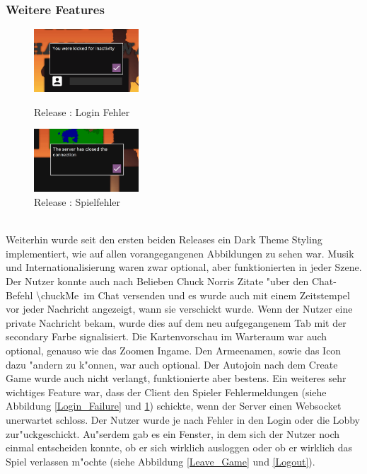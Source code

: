\documentclass[12pt, titlepage]{scrartcl}
\newcommand{\RN}[1]{%
	\textup{\uppercase\expandafter{\romannumeral#1}}%
}
\begin{document}
		    \subsubsection{Weitere Features}
		        \begin{figure}
                    \begin{center}
                        \includegraphics[width=0.35\textwidth]{images/old_state/additional/LoginFailure.png}
                        \caption{Release \RN{2}: Login Fehler}
                        \label{Login_Failure}
                    \end{center}
                    \begin{center}
                        \includegraphics[width=0.35\textwidth]{images/old_state/additional/WaitingRoomFailure.png}
                        \caption{Release \RN{2}: Spielfehler}
                        \label{Game_Failure}
                    \end{center}
                \end{figure}
		        \ \\ Weiterhin wurde seit den ersten beiden Releases ein Dark Theme Styling implementiert, wie auf allen vorangegangenen Abbildungen zu sehen war. Musik und Internationalisierung waren zwar optional, aber funktionierten in jeder Szene. Der Nutzer konnte auch nach Belieben Chuck Norris Zitate "uber den Chat-Befehl \glqq \textbackslash chuckMe\grqq\ im Chat versenden und es wurde auch mit einem Zeitstempel vor jeder Nachricht angezeigt, wann sie verschickt wurde. Wenn der Nutzer eine private Nachricht bekam, wurde dies auf dem neu aufgegangenem Tab mit der secondary Farbe signalisiert. Die Kartenvorschau im Warteraum war auch optional, genauso wie das Zoomen Ingame. Den Armeenamen, sowie das Icon dazu "andern zu k"onnen, war auch optional. Der Autojoin nach dem Create Game wurde auch nicht verlangt, funktionierte aber bestens. Ein weiteres sehr wichtiges Feature war, dass der Client den Spieler Fehlermeldungen (siehe Abbildung \ref{Login_Failure} und \ref{Game_Failure}) schickte, wenn der Server einen Websocket unerwartet schloss. Der Nutzer wurde je nach Fehler in den Login oder die Lobby zur"uckgeschickt. Au"serdem gab es ein Fenster, in dem sich der Nutzer noch einmal entscheiden konnte, ob er sich wirklich ausloggen oder ob er wirklich das Spiel verlassen m"ochte (siehe Abbildung \ref{Leave_Game} und \ref{Logout}). \\
\end{document}
